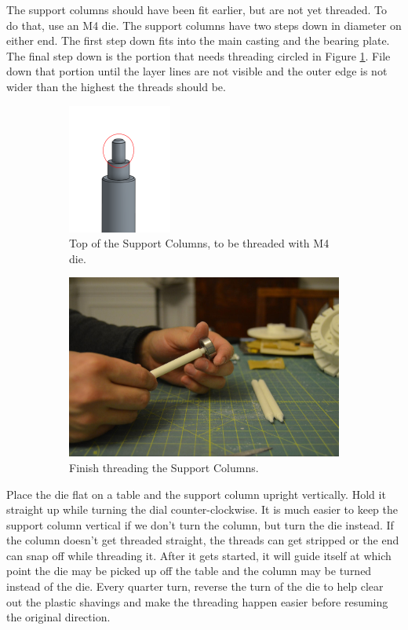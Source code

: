 \documentclass[openany]{book}
\begin{document}
The support columns should have been fit earlier, but are not yet threaded. To do that, use an M4 die. The support columns have two steps down in diameter on either end. The first step down fits into the main casting and the bearing plate. The final step down is the portion that needs threading circled in Figure \ref{fig:image14}. File down that portion until the layer lines are not visible and the outer edge is not wider than the highest the threads should be.

\begin{figure}[!ht]
\begin{subfigure}{.4\textwidth}
	\centering
	\includegraphics{images/image14.png}
	\caption{Top of the Support Columns, to be threaded with M4 die.}
	\label{fig:image14}	
\end{subfigure}
\begin{subfigure}{.5\textwidth}
	\centering
	\includegraphics[width=.95\textwidth]{images/image41.jpg}
	\caption{Finish threading the Support Columns.}
	\label{fig:image41}	
\end{subfigure}
\caption{}
\end{figure}

Place the die flat on a table and the support column upright vertically. Hold it straight up while turning the dial counter-clockwise. It is much easier to keep the support column vertical if we don’t turn the column, but turn the die instead. If the column doesn’t get threaded straight, the threads can get stripped or the end can snap off while threading it. After it gets started, it will guide itself at which point the die may be picked up off the table and the column may be turned instead of the die. Every quarter turn, reverse the turn of the die to help clear out the plastic shavings and make the threading happen easier before resuming the original direction.
\end{document}
